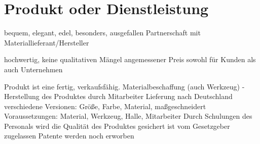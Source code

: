 \chapter{Produkt oder Dienstleistung}
\label{cha:3}

bequem, elegant, edel, besonders, ausgefallen
Partnerschaft mit Materiallieferant/Hersteller

hochwertig, keine qualitativen Mängel
angemessener Preis sowohl für Kunden als auch Unternehmen

Produkt ist eine fertig, verkaufsfähig.
Materialbeschaffung (auch Werkzeug) - Herstellung des Produktes durch Mitarbeiter
Lieferung nach Deutschland
verschiedene Versionen: Größe, Farbe, Material, maßgeschneidert
Voraussetzungen: Material, Werkzeug, Halle, Mitarbeiter
Durch Schulungen  des Personals wird die Qualität des Produktes gesichert
ist vom Gesetzgeber zugelassen
Patente werden noch erworben